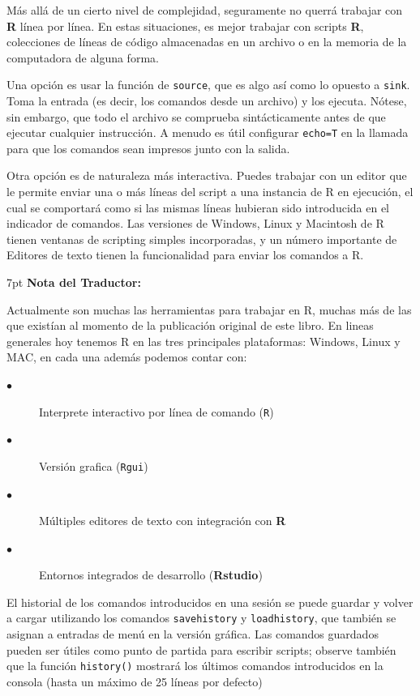\documentclass[spanish]{extbook}
\newenvironment{tradnote}{%
  \def\FrameCommand{%
    \hspace{1pt}%
    {\color{darkblue}\vrule width 2pt}%
    {\color{formalshade}\vrule width 4pt}%
    \colorbox{formalshade}%
  }%
  \vspace{12pt}
  \MakeFramed{\advance\hsize-\width\FrameRestore}%
  \noindent\hspace{-4.55pt}%
  \begin{adjustwidth}{}{7pt}%
  \vspace{1pt}%
  \textbf{Nota del Traductor:\\}%
}
{%
  \vspace{6pt}\end{adjustwidth}\endMakeFramed%
}
\numberwithin{equation}{section}
\numberwithin{figure}{section}
\begin{document}
Más allá de un cierto nivel de complejidad, seguramente no querrá trabajar con
\textbf{R} línea por línea. En estas situaciones, es mejor trabajar con scripts
\textbf{R}, colecciones de líneas de código almacenadas en un archivo o en la
memoria de la computadora de alguna forma. 

Una opción es usar la función de \texttt{source}, que es algo así como lo
opuesto a \texttt{sink}. Toma la entrada (es decir, los comandos desde un
archivo) y los ejecuta. Nótese, sin embargo, que todo el archivo se comprueba
sintácticamente antes de que ejecutar cualquier instrucción. A menudo es útil
configurar \texttt{echo=T} en la llamada para que los comandos sean impresos
junto con la salida. 

Otra opción es de naturaleza más interactiva. Puedes trabajar con un editor que
le permite enviar una o más líneas del script a una instancia de R en
ejecución, el cual se comportará como si las mismas líneas hubieran sido
introducida en el indicador de comandos. Las versiones de Windows, Linux y
Macintosh de R tienen ventanas de scripting simples incorporadas, y un número
importante de Editores de texto tienen la funcionalidad para enviar los
comandos a R.

\begin{tradnote} 
	
	Actualmente son muchas las herramientas para trabajar en R, muchas más de
	las que existían al momento de la publicación original de este libro. En
	lineas generales hoy tenemos R en las tres principales plataformas:
	Windows, Linux y MAC, en cada una además podemos contar con:

	\begin{description}
	\item[$\bullet$] Interprete interactivo por línea de comando (\texttt{R})
	\item[$\bullet$] Versión grafica (\texttt{Rgui})
	\item[$\bullet$] Múltiples editores de texto con integración con \textbf{R}
	\item[$\bullet$] Entornos integrados de desarrollo (\textbf{Rstudio})
	\end{description}

\end{tradnote}

El historial de los comandos introducidos en una sesión se puede guardar y
volver a cargar utilizando los comandos \texttt{savehistory} y
\texttt{loadhistory}, que también se asignan a entradas de menú en la versión
gráfica. Las comandos guardados pueden ser útiles como punto de partida para
escribir scripts; observe también que la función \texttt{history()} mostrará
los últimos comandos introducidos en la consola (hasta un máximo de 25 líneas
por defecto)
\end{document}
